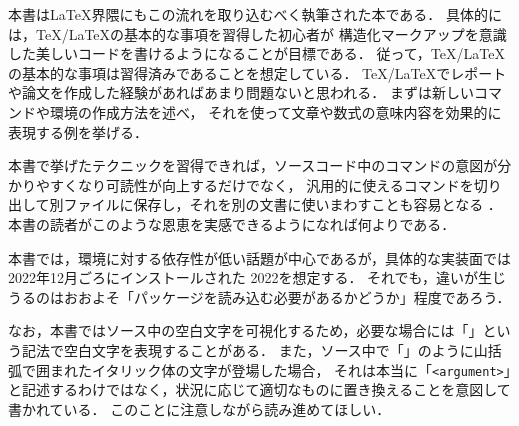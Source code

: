 本書は{\LaTeX}界隈にもこの流れを取り込むべく執筆された本である．
具体的には，{\TeX}/{\LaTeX}の基本的な事項を習得した初心者が
構造化マークアップを意識した美しいコードを書けるようになることが目標である．
従って，{\TeX}/{\LaTeX}の基本的な事項は習得済みであることを想定している．
{\TeX}/{\LaTeX}でレポートや論文を作成した経験があればあまり問題ないと思われる．
まずは新しいコマンドや環境の作成方法を述べ，
それを使って文章や数式の意味内容を効果的に表現する例を挙げる．

本書で挙げたテクニックを習得できれば，ソースコード中のコマンドの意図が分かりやすくなり可読性が向上するだけでなく，
汎用的に使えるコマンドを切り出して別ファイルに保存し，それを別の文書に使いまわすことも容易となる%
．本書の読者がこのような恩恵を実感できるようになれば何よりである．

本書では，環境に対する依存性が低い話題が中心であるが，具体的な実装面では2022年12月ごろにインストールされた{\TeXLive} 2022を想定する．
それでも，違いが生じうるのはおおよそ「パッケージを読み込む必要があるかどうか」程度であろう．

なお，本書ではソース中の空白文字を可視化するため，必要な場合には「\cs{\textvisiblespace}」という記法で空白文字を表現することがある．
また，ソース中で「」のように山括弧で囲まれたイタリック体の文字が登場した場合，
それは本当に「\lstinline|<argument>|」と記述するわけではなく，状況に応じて適切なものに置き換えることを意図して書かれている．
このことに注意しながら読み進めてほしい．